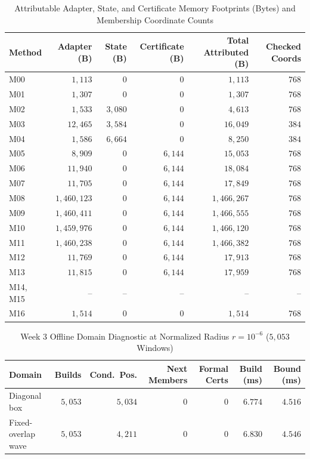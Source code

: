 \documentclass[11pt,oneside,a4paper]{report}
\newcommand{\code}[1]{{\small\upshape\ttfamily #1}}
\theoremstyle{remark}
\begin{document}
\begin{table}[htbp]
\centering\small
\caption{Attributable Adapter, State, and Certificate Memory Footprints (Bytes) and Membership Coordinate Counts}
\label{tab:app_mem}
\begin{tabularx}{\textwidth}{@{}Yrrrrr@{}}
\toprule
\textbf{Method} & \textbf{Adapter (B)} & \textbf{State (B)} & \textbf{Certificate (B)} & \textbf{Total Attributed (B)} & \textbf{Checked Coords} \\
\midrule
\code{M00} & $1,113$ & $0$ & $0$ & $1,113$ & $768$ \\
\code{M01} & $1,307$ & $0$ & $0$ & $1,307$ & $768$ \\
\code{M02} & $1,533$ & $3,080$ & $0$ & $4,613$ & $768$ \\
\code{M03} & $12,465$ & $3,584$ & $0$ & $16,049$ & $384$ \\
\code{M04} & $1,586$ & $6,664$ & $0$ & $8,250$ & $384$ \\
\code{M05} & $8,909$ & $0$ & $6,144$ & $15,053$ & $768$ \\
\code{M06} & $11,940$ & $0$ & $6,144$ & $18,084$ & $768$ \\
\code{M07} & $11,705$ & $0$ & $6,144$ & $17,849$ & $768$ \\
\code{M08} & $1,460,123$ & $0$ & $6,144$ & $1,466,267$ & $768$ \\
\code{M09} & $1,460,411$ & $0$ & $6,144$ & $1,466,555$ & $768$ \\
\code{M10} & $1,459,976$ & $0$ & $6,144$ & $1,466,120$ & $768$ \\
\code{M11} & $1,460,238$ & $0$ & $6,144$ & $1,466,382$ & $768$ \\
\code{M12} & $11,769$ & $0$ & $6,144$ & $17,913$ & $768$ \\
\code{M13} & $11,815$ & $0$ & $6,144$ & $17,959$ & $768$ \\
\code{M14}, \code{M15} & -- & -- & -- & -- & -- \\
\code{M16} & $1,514$ & $0$ & $0$ & $1,514$ & $768$ \\
\bottomrule
\end{tabularx}
\end{table}

\begin{table}[htbp]
\centering\small
\caption{Week 3 Offline Domain Diagnostic at Normalized Radius $r = 10^{-6}$ ($5,053$ Windows)}
\label{tab:app_w3_offline}
\begin{tabularx}{\textwidth}{@{}Yrrrrrr@{}}
\toprule
\textbf{Domain} & \textbf{Builds} & \textbf{Cond.\ Pos.} & \textbf{Next Members} & \textbf{Formal Certs} & \textbf{Build (ms)} & \textbf{Bound (ms)} \\
\midrule
Diagonal box & $5,053$ & $5,034$ & $0$ & $0$ & $6.774$ & $4.516$ \\
Fixed-overlap wave & $5,053$ & $4,211$ & $0$ & $0$ & $6.830$ & $4.546$ \\
\bottomrule
\end{tabularx}
\end{table}
\end{document}

